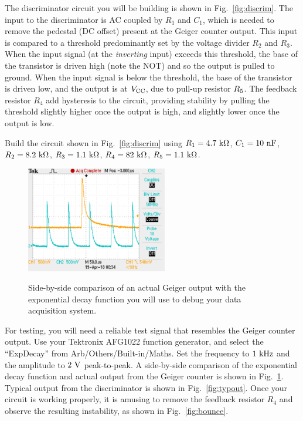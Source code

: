 \documentclass[12pt]{article}
\begin{document}
The discriminator circuit you will be building is shown in Fig.~\ref{fig:discrim}.  The input to the discriminator
is AC coupled by $R_1$ and $C_1$, which is needed to remove the pedestal (DC offset) present at the Geiger counter output.  This input is compared to a threshold predominantly set by the voltage divider $R_2$ and $R_3$.  When the input signal (at the {\em inverting} input) exceeds this threshold, the base of the transistor is driven high (note the NOT) and so the output is pulled to ground.  When the input signal is below the threshold, the base of the transistor is driven low, and the output is at $V_{\rm CC}$, due to pull-up resistor $R_{\rm 5}$.  The feedback resistor $R_4$ add hysteresis to the circuit, providing stability by pulling the threshold slightly higher once the output is high, and slightly lower once the output is low.

Build the circuit shown in Fig.~\ref{fig:discrim} using $R_1=4.7~{\rm k\Omega}$, $C_1=10~{\rm nF}$,
$R_2=8.2~{\rm k\Omega}$, $R_3=1.1~{\rm k\Omega}$, $R_4=82~{\rm k\Omega}$, $R_5=1.1~{\rm k\Omega}$.  

\begin{figure}[htbp]
\begin{center}
{\includegraphics[width=0.55\textwidth]{figs/fake.pdf}}
\end{center}
\caption{\label{fig:fake} Side-by-side comparison of an actual Geiger output with the exponential decay function you will use to debug your data acquisition system.}
\end{figure}

For testing, you will need a reliable test signal that resembles the Geiger counter output.  Use your Tektronix AFG1022 function generator, and select the ``ExpDecay'' from Arb/Others/Built-in/Maths.
Set the frequency to $1~\rm kHz$ and the amplitude to $2~\rm V$ peak-to-peak.  A side-by-side comparison of the exponential decay function and actual output from the Geiger counter is shown in Fig.~\ref{fig:fake}.  Typical output from the discriminator is shown in Fig.~\ref{fig:typout}.  Once your circuit is working properly, it is amusing to remove the feedback resistor $R_4$ and observe the resulting instability, as shown in Fig.~\ref{fig:bounce}.
\end{document}
